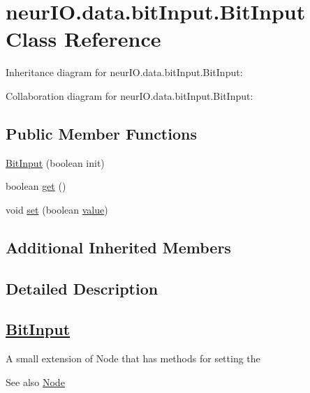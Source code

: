 \hypertarget{classneur_i_o_1_1data_1_1bit_input_1_1_bit_input}{}\section{neur\+I\+O.\+data.\+bit\+Input.\+Bit\+Input Class Reference}
\label{classneur_i_o_1_1data_1_1bit_input_1_1_bit_input}


Inheritance diagram for neur\+I\+O.\+data.\+bit\+Input.\+Bit\+Input\+:


Collaboration diagram for neur\+I\+O.\+data.\+bit\+Input.\+Bit\+Input\+:
\subsection*{Public Member Functions}
\begin{DoxyCompactItemize}
\item 
\hyperlink{classneur_i_o_1_1data_1_1bit_input_1_1_bit_input_a0cb3a5e6229418b6b2fa85184c855e32}{Bit\+Input} (boolean init)
\item 
boolean \hyperlink{classneur_i_o_1_1data_1_1bit_input_1_1_bit_input_aba6bbd1b073178133b835343a45c722e}{get} ()
\item 
void \hyperlink{classneur_i_o_1_1data_1_1bit_input_1_1_bit_input_a0fc46f4c9962c8cf8dc0387ecd61cd66}{set} (boolean \hyperlink{classneur_i_o_1_1system_1_1_node_a2c6a229d3d2cbf1b313d8797b70e487a}{value})
\end{DoxyCompactItemize}
\subsection*{Additional Inherited Members}


\subsection{Detailed Description}
\subsection*{\hyperlink{classneur_i_o_1_1data_1_1bit_input_1_1_bit_input}{Bit\+Input} }

A small extension of Node that has methods for setting the \begin{DoxySeeAlso}{See also}
\hyperlink{classneur_i_o_1_1system_1_1_node_a18dfd9e4acbf3ffbbd81870d2740254b}{Node} 
\end{DoxySeeAlso}


